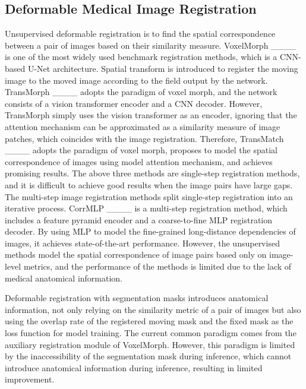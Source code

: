 \subsection{Deformable Medical Image Registration}
Unsupervised deformable registration is to find the spatial correspondence between a pair of images based on their similarity measure.
VoxelMorph ____ is one of the most widely used benchmark registration methods, which is a CNN-based U-Net architecture. Spatial transform is introduced to register the moving image to the moved image according to the field output by the network. 
TransMorph ____ adopts the paradigm of voxel morph, and the network consists of a vision transformer encoder and a CNN decoder. However, TransMorph simply uses the vision transformer as an encoder, ignoring that the attention mechanism can be approximated as a similarity measure of image patches, which coincides with the image registration. Therefore, TransMatch ____ adopts the paradigm of voxel morph, proposes to model the spatial correspondence of images using model attention mechanism, and achieves promising results.
The above three methods are single-step registration methods, and it is difficult to achieve good results when the image pairs have large gaps. The multi-step image registration methods split single-step registration into an iterative process. CorrMLP ____ is a multi-step registration method, which includes a feature pyramid encoder and a coarse-to-fine MLP registration decoder. By using MLP to model the fine-grained long-distance dependencies of images, it achieves state-of-the-art performance.
However, the unsupervised methods model the spatial correspondence of image pairs based only on image-level metrics, and the performance of the methods is limited due to the lack of medical anatomical information.

Deformable registration with segmentation masks introduces anatomical information, not only relying on the similarity metric of a pair of images but also using the overlap rate of the registered moving mask and the fixed mask as the loss function for model training. The current common paradigm comes from the auxiliary registration module of VoxelMorph. However, this paradigm is limited by the inaccessibility of the segmentation mask during inference, which cannot introduce anatomical information during inference, resulting in limited improvement.

